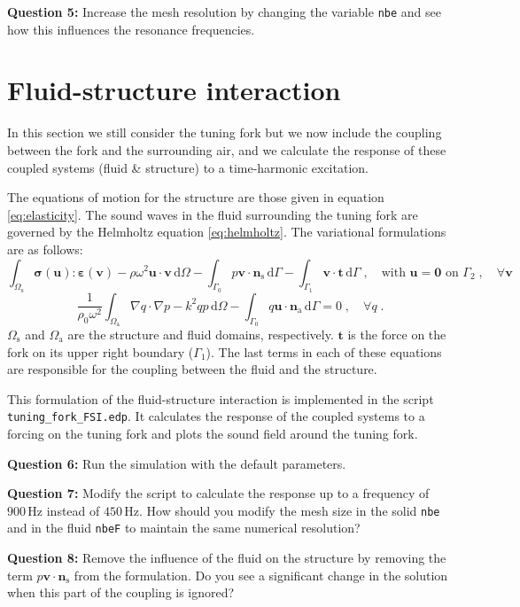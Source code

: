 \documentclass[english,3p]{elsarticle}
\newcommand{\code}[1]{\texttt{#1}}
\newcommand{\dd}{\mathrm{d}}
\begin{document}
\textbf{Question 5:} Increase the mesh resolution by changing the variable \code{nbe} and see how this influences the resonance frequencies.

\clearpage

\section{Fluid-structure interaction}

In this section we still consider the tuning fork but we now include the coupling between the fork and the surrounding air, and we calculate the response of these coupled systems (fluid \& structure) to a time-harmonic excitation.

The equations of motion for the structure are those given in equation \eqref{eq:elasticity}.
The sound waves in the fluid surrounding the tuning fork are governed by the Helmholtz equation \eqref{eq:helmholtz}.
The variational formulations are as follows:
$$
\int_{\Omega_\mathrm{s}} \boldsymbol{\sigma}(\mathbf{u}):\boldsymbol{\varepsilon}(\mathbf{v}) - \rho\omega^2\mathbf{u}\cdot\mathbf{v}\,\dd\Omega - \int_{\Gamma_0} p \mathbf{v}\cdot\mathbf{n}_\mathrm{s}\,\dd\Gamma
-\int_{\Gamma_1} \mathbf{v}\cdot\mathbf{t}\,\dd\Gamma
\;,\quad
\text{with } \mathbf{u}=\mathbf{0} \text{ on } \Gamma_2
\;,\quad
\forall \mathbf{v}
$$
$$
\frac{1}{\rho_0\omega^2}\int_{\Omega_\mathrm{a}} \nabla q\cdot\nabla p - k^2qp \,\dd\Omega - \int_{\Gamma_0} q\mathbf{u}\cdot\mathbf{n}_\mathrm{a}\,\dd\Gamma
=0
\;,\quad
\forall q
\;.
$$
$\Omega_\mathrm{s}$ and $\Omega_\mathrm{a}$ are the structure and fluid domains, respectively.
$\mathbf{t}$ is the force on the fork on its upper right boundary ($\Gamma_1$).
The last terms in each of these equations are responsible for the coupling between the fluid and the structure.

This formulation of the fluid-structure interaction is implemented in the script \code{tuning\_fork\_FSI.edp}.
It calculates the response of the coupled systems to a forcing on the tuning fork and plots the sound field around the tuning fork.

\textbf{Question 6:} Run the simulation with the default parameters.

\textbf{Question 7:} Modify the script to calculate the response up to a frequency of $900\,\mathrm{Hz}$ instead of $450\,\mathrm{Hz}$. How should you modify the mesh size in the solid \code{nbe} and in the fluid \code{nbeF} to maintain the same numerical resolution?

\textbf{Question 8:} Remove the influence of the fluid on the structure by removing the term $p\mathbf{v}\cdot\mathbf{n}_\mathrm{s}$ from the formulation. Do you see a significant change in the solution when this part of the coupling is ignored?
\end{document}
